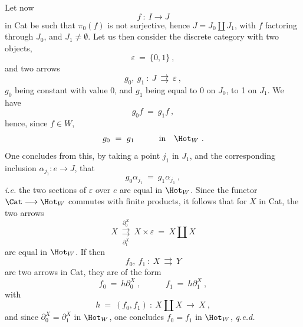 Let now
\[
f\ :\ I\longrightarrow J
\]
in Cat be such that $\pi_0(f)$ is not surjective, hence $J=J_0\amalg J_1$, with $f$ factoring through $J_0$, and $J_1\neq\emptyset$. Let us then consider the discrete category with two objects,
\[
\varepsilon\ =\ \{0,1\}\ ,
\]
and two arrows
\[
g_0,\ g_1\ :\ J\ \rightrightarrows\ \varepsilon\ ,
\]
$g_0$ being constant with value 0, and $g_1$ being equal to 0 on $J_0$, to 1 on $J_1$. We have
\[
g_0f\ =\ g_1f\ ,
\]
hence, since $f\in W$,
\[
g_0\ =\ g_1\qquad\quad\text{in}\quad\Hot_W\ .
\]
One concludes from this, by taking a point $j_1$ in $J_1$, and the corresponding inclusion $\alpha_{j_1}:e\longrightarrow J$, that
\[
g_0\alpha_{j_1}\ =\ g_1\alpha_{j_1}\ ,
\]
\textit{i.e.} the two sections of $\varepsilon$ over $e$ are equal in $\Hot_W$. Since the functor $\Cat\longrightarrow\Hot_W$ commutes with finite products, it follows that for $X$ in Cat, the two arrows
\[
X\ \underset{\partial_1^X}{\overset{\partial_0^X}{\rightrightarrows}}\ X\times\varepsilon\ =\ X\amalg X
\]
are equal in $\Hot_W$. If then
\[
f_0,\ f_1\ :\ X\ \rightrightarrows\ Y
\]
are two arrows in Cat, they are of the form
\[
f_0\ =\ h\partial_0^X\ ,\qquad\quad f_1\ =\ h\partial_1^X\ ,
\]
with
\[
h\ =\ (f_0,f_1)\ :\ X\amalg X\ \longrightarrow\ X\ , %
\]
and since $\partial_0^X=\partial_1^X$ in $\Hot_W$, one concludes $f_0=f_1$ in $\Hot_W$, \quad \textit{q.e.d.}